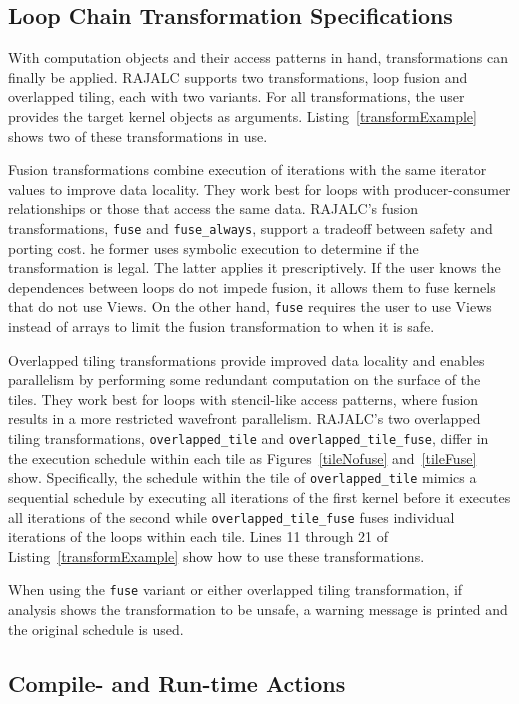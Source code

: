 \subsection{Loop Chain Transformation Specifications}
\label{sec:transspec}

With computation objects and their access patterns in hand, transformations can finally be applied.
RAJALC supports two transformations, loop fusion and overlapped tiling, each with two variants.
For all transformations, the user provides the target kernel
objects as arguments.
Listing~\ref{transformExample} shows two of these transformations in use.

Fusion transformations combine execution of iterations with the same iterator
values to improve data locality.
They work best for loops with producer-consumer relationships or those that
access the same data.
RAJALC's fusion transformations, \verb.fuse. and \verb.fuse_always., support
a tradeoff between safety and porting cost.
he former uses symbolic execution to determine if the transformation is legal.
The latter applies it prescriptively.
If the user knows the dependences between loops do not impede fusion,
it allows them to fuse kernels that do not use Views. 
On the other hand, \verb.fuse. requires the user to use Views instead
of arrays to limit the fusion transformation to when it is safe.

Overlapped tiling transformations provide improved data locality
and enables parallelism by performing some redundant computation 
on the surface of the tiles.
They work best for loops with stencil-like access patterns,
where fusion results in a more restricted wavefront parallelism.
RAJALC's two overlapped tiling transformations, \verb.overlapped_tile. and
\verb.overlapped_tile_fuse., differ in the execution schedule within each tile
as Figures~\ref{tileNofuse} and~\ref{tileFuse} show.
Specifically, the schedule within the tile of \verb.overlapped_tile. mimics
a sequential schedule by executing all iterations of the first kernel before
it executes all iterations of the second while \verb.overlapped_tile_fuse.
fuses individual iterations of the loops within each tile.
Lines 11 through 21 of Listing~\ref{transformExample} show how to use these transformations.

When using the \verb.fuse. variant or either overlapped tiling transformation, if analysis shows the transformation to be unsafe, a warning message is printed and the original schedule is used. 

\subsection{Compile- and Run-time Actions}


